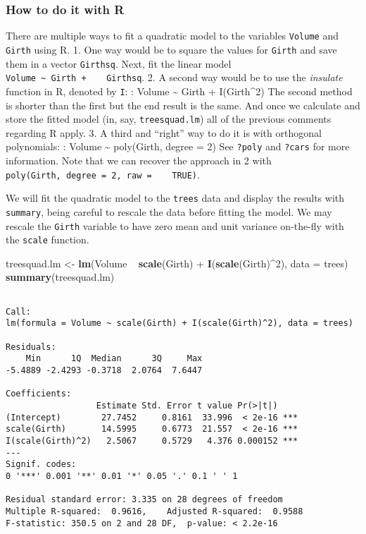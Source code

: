 \documentclass[]{book}
\newenvironment{Shaded}{\begin{snugshade}}{\end{snugshade}}
\newcommand{\KeywordTok}[1]{\textcolor[rgb]{0.13,0.29,0.53}{\textbf{{#1}}}}
\newcommand{\DataTypeTok}[1]{\textcolor[rgb]{0.13,0.29,0.53}{{#1}}}
\newcommand{\DecValTok}[1]{\textcolor[rgb]{0.00,0.00,0.81}{{#1}}}
\newcommand{\StringTok}[1]{\textcolor[rgb]{0.31,0.60,0.02}{{#1}}}
\newcommand{\NormalTok}[1]{{#1}}
\numberwithin{equation}{chapter}
\numberwithin{figure}{chapter}
\theoremstyle{plain}
\theoremstyle{definition}
\theoremstyle{remark}
\theoremstyle{definition}
\theoremstyle{definition}
\theoremstyle{remark}
\let\BeginKnitrBlock\begin \let\EndKnitrBlock\end
\begin{document}
\subsubsection{How to do it with R}\label{how-to-do-it-with-r-42}

There are multiple ways to fit a quadratic model to the variables
\texttt{Volume} and \texttt{Girth} using R. 1. One way would be to
square the values for \texttt{Girth} and save them in a vector
\texttt{Girthsq}. Next, fit the linear model
\texttt{Volume\ \textasciitilde{}\ Girth\ +\ \ \ \ Girthsq}. 2. A second
way would be to use the \emph{insulate} function in R, denoted by
\texttt{I}: : Volume \textasciitilde{} Girth + I(Girth\^{}2) The second
method is shorter than the first but the end result is the same. And
once we calculate and store the fitted model (in, say,
\texttt{treesquad.lm}) all of the previous comments regarding R apply.
3. A third and ``right'' way to do it is with orthogonal polynomials: :
Volume \textasciitilde{} poly(Girth, degree = 2) See \texttt{?poly} and
\texttt{?cars} for more information. Note that we can recover the
approach in 2 with
\texttt{poly(Girth,\ degree\ =\ 2,\ raw\ =\ \ \ \ TRUE)}.

\bigskip

\BeginKnitrBlock{example}
\protect\hypertarget{ex:unnamed-chunk-317}{}{\label{ex:unnamed-chunk-317}}We
will fit the quadratic model to the \texttt{trees} data and display the
results with \texttt{summary}, being careful to rescale the data before
fitting the model. We may rescale the \texttt{Girth} variable to have
zero mean and unit variance on-the-fly with the \texttt{scale} function.
\EndKnitrBlock{example}

\begin{Shaded}
\begin{Highlighting}[]
\NormalTok{treesquad.lm <-}\StringTok{ }\KeywordTok{lm}\NormalTok{(Volume ~}\StringTok{ }\KeywordTok{scale}\NormalTok{(Girth) +}\StringTok{ }\KeywordTok{I}\NormalTok{(}\KeywordTok{scale}\NormalTok{(Girth)^}\DecValTok{2}\NormalTok{), }\DataTypeTok{data =} \NormalTok{trees)}
\KeywordTok{summary}\NormalTok{(treesquad.lm)}
\end{Highlighting}
\end{Shaded}

\begin{verbatim}

Call:
lm(formula = Volume ~ scale(Girth) + I(scale(Girth)^2), data = trees)

Residuals:
    Min      1Q  Median      3Q     Max 
-5.4889 -2.4293 -0.3718  2.0764  7.6447 

Coefficients:
                  Estimate Std. Error t value Pr(>|t|)    
(Intercept)        27.7452     0.8161  33.996  < 2e-16 ***
scale(Girth)       14.5995     0.6773  21.557  < 2e-16 ***
I(scale(Girth)^2)   2.5067     0.5729   4.376 0.000152 ***
---
Signif. codes:  
0 '***' 0.001 '**' 0.01 '*' 0.05 '.' 0.1 ' ' 1

Residual standard error: 3.335 on 28 degrees of freedom
Multiple R-squared:  0.9616,    Adjusted R-squared:  0.9588 
F-statistic: 350.5 on 2 and 28 DF,  p-value: < 2.2e-16
\end{verbatim}
\end{document}
